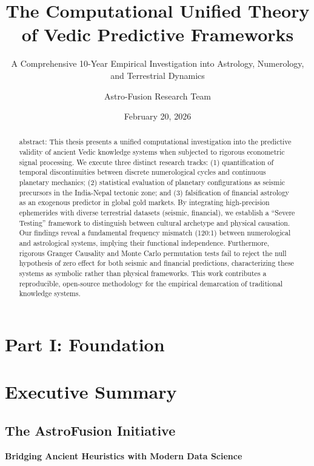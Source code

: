 \documentclass[
  11pt,
  a4paper,
  oneside,
  openany]{report}
\title{The Computational Unified Theory of Vedic Predictive Frameworks}
\subtitle{A Comprehensive 10-Year Empirical Investigation into
Astrology, Numerology, and Terrestrial Dynamics}
\author{Astro-Fusion Research Team}
\date{February 20, 2026}
\renewcommand*\contentsname{Table of contents}
\newcommand\contentsname{Table of contents}
\begin{document}
\maketitle
\begin{abstract}
abstract: \textbar{} This thesis presents a unified computational
investigation into the predictive validity of ancient Vedic knowledge
systems when subjected to rigorous econometric signal processing. We
execute three distinct research tracks: (1) quantification of temporal
discontinuities between discrete numerological cycles and continuous
planetary mechanics; (2) statistical evaluation of planetary
configurations as seismic precursors in the India-Nepal tectonic zone;
and (3) falsification of financial astrology as an exogenous predictor
in global gold markets. By integrating high-precision ephemerides with
diverse terrestrial datasets (seismic, financial), we establish a
``Severe Testing'' framework to distinguish between cultural archetype
and physical causation. Our findings reveal a fundamental frequency
mismatch (120:1) between numerological and astrological systems,
implying their functional independence. Furthermore, rigorous Granger
Causality and Monte Carlo permutation tests fail to reject the null
hypothesis of zero effect for both seismic and financial predictions,
characterizing these systems as symbolic rather than physical
frameworks. This work contributes a reproducible, open-source
methodology for the empirical demarcation of traditional knowledge
systems.
\end{abstract}

\renewcommand*\contentsname{Table of contents}
{
\hypersetup{linkcolor=}
\setcounter{tocdepth}{3}
\tableofcontents
}
\listoffigures
\listoftables
{}
\chapter{Part I: Foundation}\label{part-i-foundation}

\chapter{Executive Summary}\label{executive-summary}

\section{The AstroFusion Initiative}\label{the-astrofusion-initiative}

\textbf{Bridging Ancient Heuristics with Modern Data Science}
\end{document}
